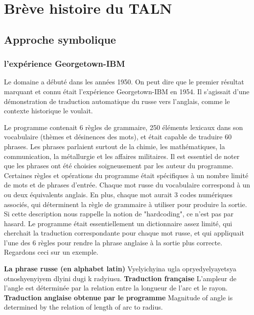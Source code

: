 \documentclass[11pt,a4paper]{report}
\begin{document}
\chapter{Brève histoire du TALN}
  \section*{Approche symbolique}
    \subsection*{l'expérience Georgetown-IBM}
Le domaine a débuté dans les années 1950. On peut dire que le premier résultat 
marquant et connu était l'expérience Georgetown-IBM en 1954. Il s'agissait d'une 
démonstration de traduction automatique du russe vers l'anglais, comme le 
contexte historique le voulait.

Le programme contenait 6 règles de grammaire, 250 éléments lexicaux dans son 
vocabulaire (thèmes et désinences des mots), et était capable de traduire 60 
phrases. Les phrases parlaient surtout de la chimie, les mathématiques, la 
communication, la métallurgie et les affaires militaires. Il est essentiel de 
noter que les phrases ont été choisies soigneusement par les auteur du programme. 
Certaines règles et opérations du programme était spécifiques à un nombre limité 
de mots et de phrases d'entrée. Chaque mot russe du vocabulaire correspond à un ou deux 
équivalents anglais. En plus, chaque mot aurait 3 codes numériques associés, qui 
déterminent la règle de grammaire à utiliser pour produire la sortie. 
Si cette description nous rappelle la notion de 
"hardcoding", ce n'est pas par hasard. Le programme était essentiellement un 
dictionnaire assez limité, qui cherchait la traduction correspondante pour chaque 
mot russe, et qui appliquait l'une des 6 règles pour rendre la phrase anglaise 
à la sortie plus correcte. Regardons ceci sur un exemple. 

\noindent \textbf{La phrase russe (en alphabet latin)} \newline 
Vyelyichyina ugla opryedyelyayetsya otnoshyenyiyem dlyini dugi k radyiusu. \newline  
\textbf{Traduction française} \newline 
L'ampleur de l'angle est déterminée par la relation entre la longueur de l'arc et le rayon. \newline 
\textbf{Traduction anglaise obtenue par le programme} \newline 
Magnitude of angle is determined by the relation of length of arc to radius.
\end{document}
